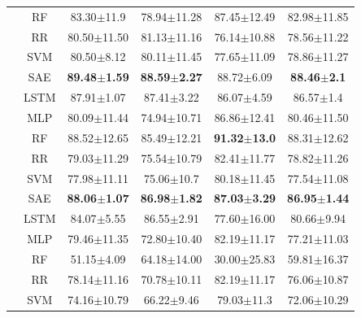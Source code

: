 \begin{table}[h]
\begin{tabular}{|c|c|c|c|c|c|}
    & RF & \multicolumn{1}{c}{83.30$\pm$11.9} & \multicolumn{1}{c}{78.94$\pm$11.28} & \multicolumn{1}{c}{87.45$\pm$12.49} & 82.98$\pm$11.85\\
    & RR & \multicolumn{1}{c}{80.50$\pm$11.50} & \multicolumn{1}{c}{81.13$\pm$11.16} & \multicolumn{1}{c}{76.14$\pm$10.88} & 78.56$\pm$11.22\\
    & SVM & \multicolumn{1}{c}{80.50$\pm$8.12} & \multicolumn{1}{c}{80.11$\pm$11.45} & \multicolumn{1}{c}{77.65$\pm$11.09} & 78.86$\pm$11.27\\
    \Xhline{1pt}
    \multirow{6}{*}{75\%} %
    & SAE & \multicolumn{1}{c}{{\bfseries 89.48$\pm$1.59}} & \multicolumn{1}{c}{{\bfseries 88.59$\pm$2.27}} & \multicolumn{1}{c}{88.72$\pm$6.09} & {\bfseries 88.46$\pm$2.1}\\
    & LSTM & \multicolumn{1}{c}{87.91$\pm$1.07} & \multicolumn{1}{c}{87.41$\pm$3.22} & \multicolumn{1}{c}{86.07$\pm$4.59} & 86.57$\pm$1.4\\
    & MLP & \multicolumn{1}{c}{80.09$\pm$11.44} & \multicolumn{1}{c}{74.94$\pm$10.71} & \multicolumn{1}{c}{86.86$\pm$12.41} & 80.46$\pm$11.50\\
    & RF & \multicolumn{1}{c}{88.52$\pm$12.65} & \multicolumn{1}{c}{85.49$\pm$12.21} & \multicolumn{1}{c}{{\bfseries 91.32$\pm$13.0}} & 88.31$\pm$12.62\\
    & RR & \multicolumn{1}{c}{79.03$\pm$11.29} & \multicolumn{1}{c}{75.54$\pm$10.79} & \multicolumn{1}{c}{82.41$\pm$11.77} & 78.82$\pm$11.26\\
    & SVM & \multicolumn{1}{c}{77.98$\pm$11.11} & \multicolumn{1}{c}{75.06$\pm$10.7} & \multicolumn{1}{c}{80.18$\pm$11.45} & 77.54$\pm$11.08\\
    \Xhline{1pt}
    \multirow{6}{*}{80\%} %
    & SAE & \multicolumn{1}{c}{{\bfseries 88.06$\pm$1.07}} & \multicolumn{1}{c}{{\bfseries 86.98$\pm$1.82}} & \multicolumn{1}{c}{{\bfseries 87.03$\pm$3.29}} & {\bfseries 86.95$\pm$1.44}\\
    & LSTM & \multicolumn{1}{c}{84.07$\pm$5.55} & \multicolumn{1}{c}{86.55$\pm$2.91} & \multicolumn{1}{c}{77.60$\pm$16.00} & 80.66$\pm$9.94\\
    & MLP & \multicolumn{1}{c}{79.46$\pm$11.35} & \multicolumn{1}{c}{72.80$\pm$10.40} & \multicolumn{1}{c}{82.19$\pm$11.17} & 77.21$\pm$11.03\\
    & RF & \multicolumn{1}{c}{51.15$\pm$4.09} & \multicolumn{1}{c}{64.18$\pm$14.00} & \multicolumn{1}{c}{30.00$\pm$25.83} & 59.81$\pm$16.37\\
    & RR & \multicolumn{1}{c}{78.14$\pm$11.16} & \multicolumn{1}{c}{70.78$\pm$10.11} & \multicolumn{1}{c}{82.19$\pm$11.17} & 76.06$\pm$10.87\\
    & SVM & \multicolumn{1}{c}{74.16$\pm$10.79} & \multicolumn{1}{c}{66.22$\pm$9.46} & \multicolumn{1}{c}{79.03$\pm$11.3} & 72.06$\pm$10.29\\
    \cline{1-6}
    \end{tabular}
\end{table}

